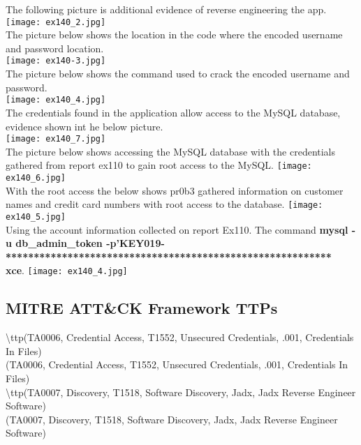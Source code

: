 \documentclass[notitlepage]{article}
\begin{document}
	\indent The following picture is additional evidence of reverse engineering the app. \\
	\texttt{[image: ex140\_2.jpg]} \\
	\indent The picture below shows the location in the code where the encoded username and password location.\\
	\texttt{[image: ex140-3.jpg]} \\
	\indent The picture below shows the command used to crack the encoded username and password.\\
	\texttt{[image: ex140\_4.jpg]} \\
	\indent The credentials found in the application allow access to the MySQL database, evidence shown int he below picture. \\
	\texttt{[image: ex140\_7.jpg]} \\
	\indent The picture below shows accessing the MySQL database with the credentials gathered from report ex110 to gain root access to the MySQL. 
	\texttt{[image: ex140\_6.jpg]} \\
	\indent With the root access the below shows pr0b3 gathered information on customer names and credit card numbers with root access to the database. 
	\texttt{[image: ex140\_5.jpg]} \\
	\indent Using the account information collected on report Ex110. The command \textbf{mysql -u db\_admin\_token -p'KEY019-**********************************************************\\xce}.  
	\texttt{[image: ex140\_4.jpg]} \\
	
	
	
	
	\subsection{MITRE ATT{\&}CK Framework TTPs}
	
	\indent\textbackslash ttp(TA0006, Credential Access, T1552, Unsecured Credentials, .001, Credentials In Files) \\
	\ttp(TA0006, Credential Access, T1552, Unsecured Credentials, .001, Credentials In Files) \\
	
	\indent\textbackslash ttp(TA0007, Discovery, T1518, Software Discovery, Jadx, Jadx Reverse Engineer Software) \\
	\ttp(TA0007, Discovery, T1518, Software Discovery, Jadx, Jadx Reverse Engineer Software) \\
\end{document}
